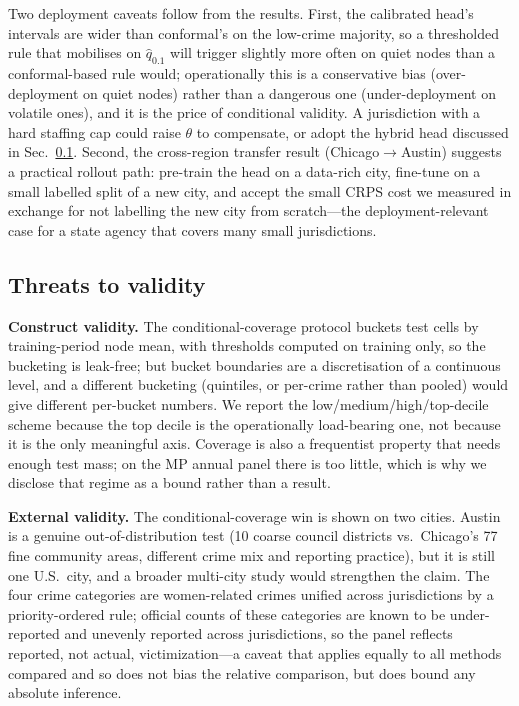 \documentclass[11pt,conference]{IEEEtran}
\begin{document}
Two deployment caveats follow from the results. First, the calibrated head's
intervals are wider than conformal's on the low-crime majority, so a
thresholded rule that mobilises on $\hat q_{0.1}$ will trigger slightly more
often on quiet nodes than a conformal-based rule would; operationally this is a
conservative bias (over-deployment on quiet nodes) rather than a dangerous one
(under-deployment on volatile ones), and it is the price of conditional
validity. A jurisdiction with a hard staffing cap could raise $\theta$ to
compensate, or adopt the hybrid head discussed in Sec.~\ref{sec:threats}.
Second, the cross-region transfer result (Chicago$\to$Austin) suggests a
practical rollout path: pre-train the head on a data-rich city, fine-tune on a
small labelled split of a new city, and accept the small CRPS cost we measured
in exchange for not labelling the new city from scratch---the deployment-relevant
case for a state agency that covers many small jurisdictions.

\subsection{Threats to validity}\label{sec:threats}
\textbf{Construct validity.} The conditional-coverage protocol buckets test
cells by training-period node mean, with thresholds computed on training only,
so the bucketing is leak-free; but bucket boundaries are a discretisation of a
continuous level, and a different bucketing (quintiles, or per-crime rather than
pooled) would give different per-bucket numbers. We report the
low/medium/high/top-decile scheme because the top decile is the operationally
load-bearing one, not because it is the only meaningful axis. Coverage is also a
frequentist property that needs enough test mass; on the MP annual panel there is
too little, which is why we disclose that regime as a bound rather than a result.

\textbf{External validity.} The conditional-coverage win is shown on two cities.
Austin is a genuine out-of-distribution test (10 coarse council districts vs.\
Chicago's 77 fine community areas, different crime mix and reporting practice),
but it is still one U.S.\ city, and a broader multi-city study would strengthen
the claim. The four crime categories are women-related crimes unified across
jurisdictions by a priority-ordered rule; official counts of these categories
are known to be under-reported and unevenly reported across jurisdictions, so
the panel reflects reported, not actual, victimization---a caveat that applies
equally to all methods compared and so does not bias the relative comparison,
but does bound any absolute inference.
\end{document}
